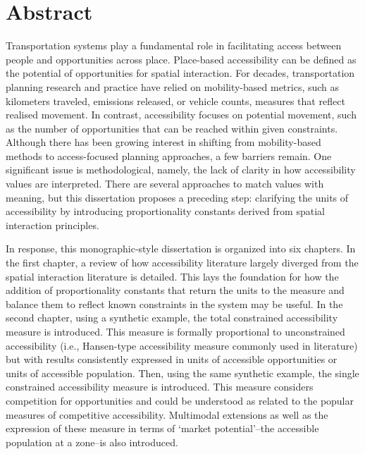 \documentclass[
11pt, %
oneside, %
english, %
singlespacing, %
]{macthesis} %
\begin{document}

\section*{\Huge Abstract}
\addchaptertocentry{\abstractname}
Transportation systems play a fundamental role in facilitating access between people and opportunities across place. Place-based accessibility can be defined as the potential of opportunities for spatial interaction. For decades, transportation planning research and practice have relied on mobility-based metrics, such as kilometers traveled, emissions released, or vehicle counts, measures that reflect realised movement. In contrast, accessibility focuses on potential movement, such as the number of opportunities that can be reached within given constraints. Although there has been growing interest in shifting from mobility-based methods to access-focused planning approaches, a few barriers remain. One significant issue is methodological, namely, the lack of clarity in how accessibility values are interpreted. There are several approaches to match values with meaning, but this dissertation proposes a preceding step: clarifying the units of accessibility by introducing proportionality constants derived from spatial interaction principles.

In response, this monographic-style dissertation is organized into six chapters. In the first chapter, a review of how accessibility literature largely diverged from the spatial interaction literature is detailed. This lays the foundation for how the addition of proportionality constants that return the units to the measure and balance them to reflect known constraints in the system may be useful. In the second chapter, using a synthetic example, the total constrained accessibility measure is introduced. This measure is formally proportional to unconstrained accessibility (i.e., Hansen-type accessibility measure commonly used in literature) but with results consistently expressed in units of accessible opportunities or units of accessible population. Then, using the same synthetic example, the single constrained accessibility measure is introduced. This measure considers competition for opportunities and could be understood as related to the popular measures of competitive accessibility. Multimodal extensions as well as the expression of these measure in terms of `market potential'--the accessible population at a zone--is also introduced.
\end{document}
